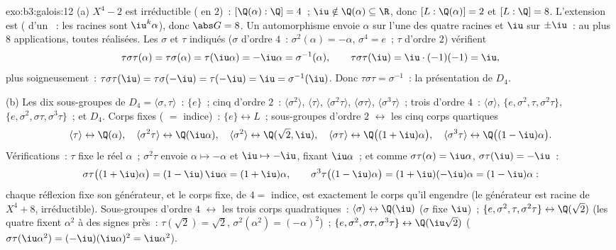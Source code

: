 \begin{solution}{exo:b3:galois:12}
(a) $X^4 - 2$ est irréductible ( en $2$)~:
$[\Q(\alpha):\Q] = 4$~; $\iu \notin \Q(\alpha) \subseteq \R$,
donc $[L : \Q(\alpha)] = 2$ et $[L:\Q] = 8$. L'extension est
 ( d'un ~:
les racines sont $\iu^k\alpha$), donc $\abs G = 8$. Un
automorphisme envoie $\alpha$ sur l'une des quatre racines et
$\iu$ sur $\pm\iu$~: au plus $8$ applications, toutes
réalisées. Les $\sigma$ et $\tau$ indiqués ($\sigma$ d'ordre
$4$~: $\sigma^2(\alpha) = -\alpha$, $\sigma^4 = e$~; $\tau$
d'ordre $2$) vérifient
\[
\tau\sigma\tau(\alpha) = \tau\sigma(\alpha) =
\tau(\iu\alpha) = -\iu\alpha = \sigma^{-1}(\alpha),
\qquad \tau\sigma\tau(\iu) = \iu\cdot(-1)(-1) = \iu ,
\]
plus soigneusement~: $\tau\sigma\tau(\iu) = \tau\sigma(-\iu) =
\tau(-\iu) = \iu = \sigma^{-1}(\iu)$. Donc $\tau\sigma\tau =
\sigma^{-1}$~: la présentation de $D_4$.

(b) Les dix sous-groupes de $D_4 = \langle\sigma,
\tau\rangle$~: $\{e\}$~; cinq d'ordre $2$~:
$\langle\sigma^2\rangle$, $\langle\tau\rangle$,
$\langle\sigma^2\tau\rangle$, $\langle\sigma\tau\rangle$,
$\langle\sigma^3\tau\rangle$~; trois d'ordre $4$~:
$\langle\sigma\rangle$, $\{e, \sigma^2, \tau,
\sigma^2\tau\}$, $\{e, \sigma^2, \sigma\tau,
\sigma^3\tau\}$~; et $D_4$. Corps fixes ( $=$
indice)~: $\{e\} \leftrightarrow L$~; sous-groupes d'ordre $2$
$\leftrightarrow$ les cinq corps quartiques
\[
\langle\tau\rangle \leftrightarrow \Q(\alpha),\quad
\langle\sigma^2\tau\rangle \leftrightarrow \Q(\iu\alpha),
\quad
\langle\sigma^2\rangle \leftrightarrow \Q(\sqrt2, \iu),\quad
\langle\sigma\tau\rangle \leftrightarrow
\Q\bigl((1+\iu)\alpha\bigr),\quad
\langle\sigma^3\tau\rangle \leftrightarrow
\Q\bigl((1-\iu)\alpha\bigr) .
\]
Vérifications~: $\tau$ fixe le réel $\alpha$~; $\sigma^2\tau$
envoie $\alpha \mapsto -\alpha$ et $\iu \mapsto -\iu$, fixant
$\iu\alpha$~; et comme $\sigma\tau(\alpha) = \iu\alpha$,
$\sigma\tau(\iu) = -\iu$~:
\[
\sigma\tau\bigl((1+\iu)\alpha\bigr) =
(1 - \iu)\,\iu\alpha = (1 + \iu)\alpha,
\qquad
\sigma^3\tau\bigl((1-\iu)\alpha\bigr) =
(1 + \iu)(-\iu)\alpha = (1 - \iu)\alpha :
\]
chaque réflexion fixe son générateur, et le corps fixe, de
 $4 = $ indice, est exactement le corps qu'il engendre
(le générateur est racine de $X^4 + 8$, irréductible).
Sous-groupes d'ordre $4$ $\leftrightarrow$ les trois corps
quadratiques~: $\langle\sigma\rangle \leftrightarrow \Q(\iu)$
($\sigma$ fixe $\iu$)~; $\{e, \sigma^2, \tau, \sigma^2\tau\}
\leftrightarrow \Q(\sqrt2)$ (les quatre fixent $\alpha^2$ à
des signes près~: $\tau(\sqrt2) = \sqrt2$, $\sigma^2(\alpha^2)
= (-\alpha)^2$)~; $\{e, \sigma^2, \sigma\tau, \sigma^3\tau\}
\leftrightarrow \Q(\iu\sqrt2)$ ($\sigma\tau(\iu\alpha^2) =
(-\iu)(\iu\alpha)^2 = \iu\alpha^2$).


\end{solution}
